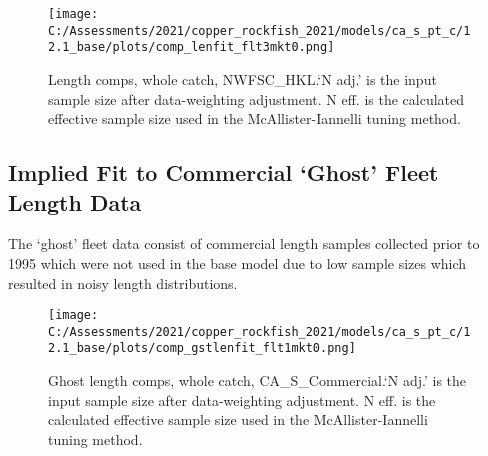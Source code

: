\documentclass[11pt,
  english,
  a4paper,
]{article}
\begin{document}
\begin{figure}
\centering
\texttt{[image: C:/Assessments/2021/copper\_rockfish\_2021/models/ca\_s\_pt\_c/12.1\_base/plots/comp\_lenfit\_flt3mkt0.png]}
\caption{Length comps, whole catch, NWFSC\_HKL.`N adj.' is the input sample size after data-weighting adjustment. N eff. is the calculated effective sample size used in the McAllister-Iannelli tuning method.\label{fig:comp_lenfit_flt3mkt0}}
\end{figure}

\tagmcend\tagstructend

\newpage


\hypertarget{implied-fit-to-commercial-ghost-fleet-length-data}{%
\subsection{Implied Fit to Commercial `Ghost' Fleet Length Data}\label{implied-fit-to-commercial-ghost-fleet-length-data}}

\leavevmode\tagmcend\tagstructend


The `ghost' fleet data consist of commercial length samples collected prior to 1995 which were not used in the base model due to low sample sizes which resulted in noisy length distributions.

\leavevmode\tagmcend\tagstructend\par


\begin{figure}
\centering
\texttt{[image: C:/Assessments/2021/copper\_rockfish\_2021/models/ca\_s\_pt\_c/12.1\_base/plots/comp\_gstlenfit\_flt1mkt0.png]}
\caption{Ghost length comps, whole catch, CA\_S\_Commercial.`N adj.' is the input sample size after data-weighting adjustment. N eff. is the calculated effective sample size used in the McAllister-Iannelli tuning method.\label{fig:comp_gstlenfit_flt1mkt0}}
\end{figure}

\tagmcend\tagstructend
\end{document}
